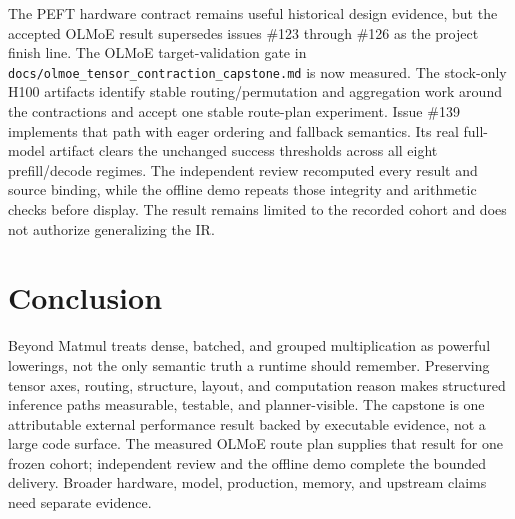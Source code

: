 \documentclass[11pt]{article}
\begin{document}
The PEFT hardware contract remains useful historical design evidence, but the
accepted OLMoE result supersedes issues \#123 through \#126 as the project
finish line. The OLMoE target-validation gate in
\texttt{docs/olmoe\_tensor\_contraction\_capstone.md} is now measured. The
stock-only H100 artifacts identify stable routing/permutation and aggregation
work around the contractions and accept one stable route-plan experiment. Issue
\#139 implements that path with eager ordering and fallback semantics. Its real
full-model artifact clears the unchanged success thresholds across all eight
prefill/decode regimes. The independent review recomputed every result and
source binding, while the offline demo repeats those integrity and arithmetic
checks before display. The result remains limited to the recorded cohort and
does not authorize generalizing the IR.

\section{Conclusion}

Beyond Matmul treats dense, batched, and grouped multiplication as powerful
lowerings, not the only semantic truth a runtime should remember. Preserving
tensor axes, routing, structure, layout, and computation reason makes structured
inference paths measurable, testable, and planner-visible. The capstone is one
attributable external performance result backed by executable evidence, not a
large code surface. The measured OLMoE route plan supplies that result for one
frozen cohort; independent review and the offline demo complete the bounded
delivery. Broader hardware, model, production, memory, and upstream claims need
separate evidence.
\end{document}

